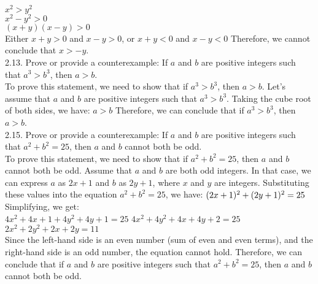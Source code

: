 \documentclass{article}
\begin{document}
\\$x^2 > y^2$
\\$x^2 - y^2 > 0$
\\$(x + y)(x - y) > 0$
\\[2\baselineskip]Either $x + y > 0$ and $x - y > 0$, or $x + y < 0$ and $x - y < 0$ Therefore, we cannot conclude that $x > -y$.
\\[2\baselineskip]2.13. Prove or provide a counterexample: If $a$ and $b$ are positive integers such that $a^3 > b^3$, then $a > b$.
\\[2\baselineskip]To prove this statement, we need to show that if $a^3 > b^3$, then $a > b$. Let's assume that $a$ and $b$ are positive integers such that $a^3 > b^3$. Taking the cube root of both sides, we have: $a > b$ Therefore, we can conclude that if $a^3 > b^3$, then $a > b$.
\\[2\baselineskip]2.15. Prove or provide a counterexample: If $a$ and $b$ are positive integers such that $a^2 + b^2 = 25$, then $a$ and $b$ cannot both be odd.
\\[2\baselineskip]To prove this statement, we need to show that if $a^2 + b^2 = 25$, then $a$ and $b$ cannot both be odd. Assume that $a$ and $b$ are both odd integers. In that case, we can express $a$ as $2x + 1$ and $b$ as $2y + 1$, where $x$ and $y$ are integers. Substituting these values into the equation $a^2 + b^2 = 25$, we have: $
\\[2\baselineskip](2x + 1)^2 + (2y + 1)^2 = 25$
\\[2\baselineskip]Simplifying, we get:
\\[2\baselineskip]$4x^2 + 4x + 1 + 4y^2 + 4y + 1 = 25$ $4x^2 + 4y^2 + 4x + 4y + 2 = 25$ $2x^2 + 2y^2 + 2x + 2y = 11$
\\[2\baselineskip]Since the left-hand side is an even number (sum of even and even terms), and the right-hand side is an odd number, the equation cannot hold. Therefore, we can conclude that if $a$ and $b$ are positive integers such that $a^2 + b^2 = 25$, then $a$ and $b$ cannot both be odd.
\end{document}
